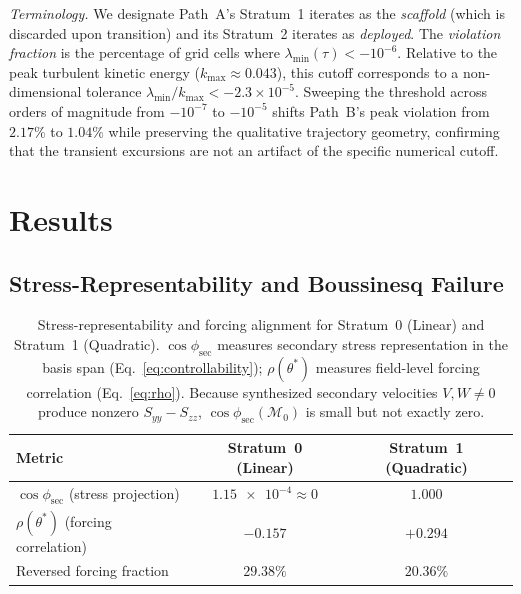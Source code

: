 \documentclass[preprint,aps,prb,longbibliography,superscriptaddress]{revtex4-2}
\begin{document}
\emph{Terminology.} We designate Path~A's Stratum~1 iterates as the
\emph{scaffold} (which is discarded upon transition) and its Stratum~2 iterates
as \emph{deployed}. The \emph{violation fraction} is the percentage of grid
cells where $\lambda_{\min}(\tau) < -10^{-6}$. Relative to the peak turbulent
kinetic energy ($k_{\max} \approx 0.043$), this cutoff corresponds to a
non-dimensional tolerance $\lambda_{\min}/k_{\max} < -2.3\times 10^{-5}$.
Sweeping the threshold across orders of magnitude from $-10^{-7}$ to $-10^{-5}$
shifts Path~B's peak violation from $2.17\%$ to $1.04\%$ while preserving the
qualitative trajectory geometry, confirming that the transient excursions are
not an artifact of the specific numerical cutoff.

\section{Results}\label{sec:results}

\subsection{Stress-Representability and Boussinesq Failure}
\label{sec:representability_results}

\begin{table}[t]
\caption{Stress-representability and forcing alignment for Stratum~0 (Linear)
  and Stratum~1 (Quadratic). $\cos\phi_{\mathrm{sec}}$ measures secondary stress
  representation in the basis span (Eq.~\ref{eq:controllability});
  $\rho(\theta^*)$ measures field-level forcing correlation (Eq.~\ref{eq:rho}).
  Because synthesized secondary velocities $V, W \neq 0$ produce nonzero
  $S_{yy} - S_{zz}$, $\cos\phi_{\mathrm{sec}}(\mathcal{M}_0)$ is small but
  not exactly zero.}\label{tab:representability}
\begin{ruledtabular}
\begin{tabular}{lcc}
  Metric & Stratum~0 (Linear) & Stratum~1 (Quadratic) \\
  \midrule
  $\cos\phi_{\mathrm{sec}}$ (stress projection)
    & $\num{1.15e-4} \approx 0$ & $1.000$ \\[3pt]
  $\rho(\theta^*)$ (forcing correlation)
    & $-0.157$ & $+0.294$ \\[3pt]
  Reversed forcing fraction
    & $29.38\%$ & $20.36\%$ \\
\end{tabular}
\end{ruledtabular}
\end{table}
\end{document}
